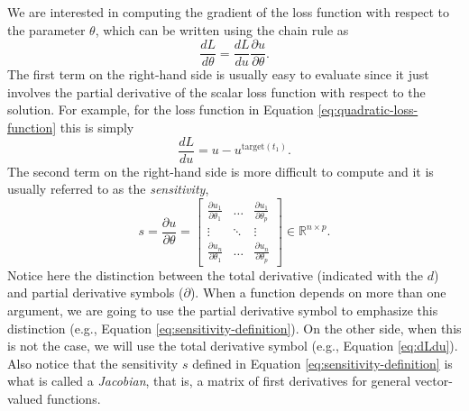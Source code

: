 We are interested in computing the gradient of the loss function with respect to the parameter $\theta$, which can be written using the chain rule as
\begin{equation} 
 \frac{dL}{d\theta} = \frac{dL}{du} \frac{\partial u}{\partial \theta}.
 \label{eq:dLdtheta_VJP}
\end{equation} 
The first term on the right-hand side is usually easy to evaluate since it just involves the partial derivative of the scalar loss function with respect to the solution.
For example, for the loss function in Equation \eqref{eq:quadratic-loss-function} this is simply
\begin{equation}
    \frac{dL}{du} = u - u^{\text{target}(t_1)}.
    \label{eq:dLdu}
\end{equation}
The second term on the right-hand side is more difficult to compute and it is usually referred to as the \textit{sensitivity},
\begin{equation}
 s 
 = 
 \frac{\partial u}{\partial \theta} 
 =
 \begin{bmatrix}
   \frac{\partial u_1}{\partial \theta_1} & \dots & \frac{\partial u_1}{\partial \theta_p} \\
   \vdots & \ddots & \vdots \\
   \frac{\partial u_n}{\partial \theta_1} & \dots & \frac{\partial u_n}{\partial \theta_p}
 \end{bmatrix}
 \in \mathbb R^{n \times p}.
 \label{eq:sensitivity-definition}
\end{equation}
Notice here the distinction between the total derivative (indicated with the $d$) and partial derivative symbols ($\partial$). 
When a function depends on more than one argument, we are going to use the partial derivative symbol to emphasize this distinction (e.g., Equation \eqref{eq:sensitivity-definition}). 
On the other side, when this is not the case, we will use the total derivative symbol (e.g., Equation \eqref{eq:dLdu}).
Also notice that the sensitivity $s$ defined in Equation \eqref{eq:sensitivity-definition} is what is called a \textit{Jacobian}, that is, a matrix of first derivatives for general vector-valued functions.

